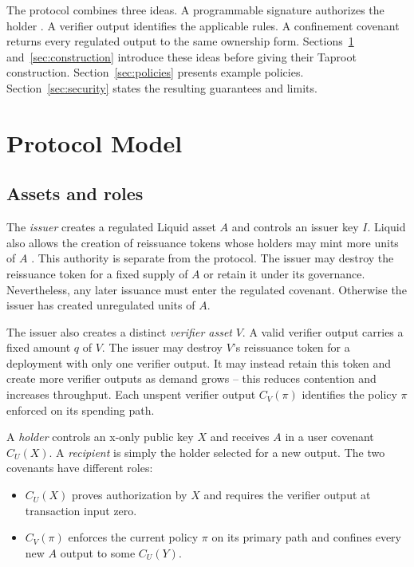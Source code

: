 \documentclass[11pt]{article}
\begin{document}
    The protocol combines three ideas.
    A programmable signature authorizes the holder \cite{programmable-signatures}.
    A verifier output identifies the applicable rules.
    A confinement covenant returns every regulated output to the same ownership form.
    Sections~\ref{sec:model} and~\ref{sec:construction} introduce these ideas before giving their Taproot construction.
    Section~\ref{sec:policies} presents example policies.
    Section~\ref{sec:security} states the resulting guarantees and limits.


    \section{Protocol Model}
    \label{sec:model}

    \subsection{Assets and roles}

    The \emph{issuer} creates a regulated Liquid asset $A$ and controls an issuer key $I$.
    Liquid also allows the creation of reissuance tokens whose holders may mint more units of $A$ \cite{liquid-assets}.
    This authority is separate from the protocol.
    The issuer may destroy the reissuance token for a fixed supply of $A$ or retain it under its governance.
    Nevertheless, any later issuance must enter the regulated covenant.
    Otherwise the issuer has created unregulated units of $A$.

    The issuer also creates a distinct \emph{verifier asset} $V$.
    A valid verifier output carries a fixed amount $q$ of $V$.
    The issuer may destroy $V$'s reissuance token for a deployment with only one verifier output.
    It may instead retain this token and create more verifier outputs as demand grows -- this reduces contention and increases throughput.
    Each unspent verifier output $C_V(\pi)$ identifies the policy $\pi$ enforced on its spending path.

    A \emph{holder} controls an x-only public key $X$ and receives $A$ in a user covenant $C_U(X)$.
    A \emph{recipient} is simply the holder selected for a new output.
    The two covenants have different roles:

    \begin{itemize}
        \item $C_U(X)$ proves authorization by $X$ and requires the verifier output at transaction input zero.
        \item $C_V(\pi)$ enforces the current policy $\pi$ on its primary path and confines every new $A$ output to some $C_U(Y)$.
    \end{itemize}
\end{document}
